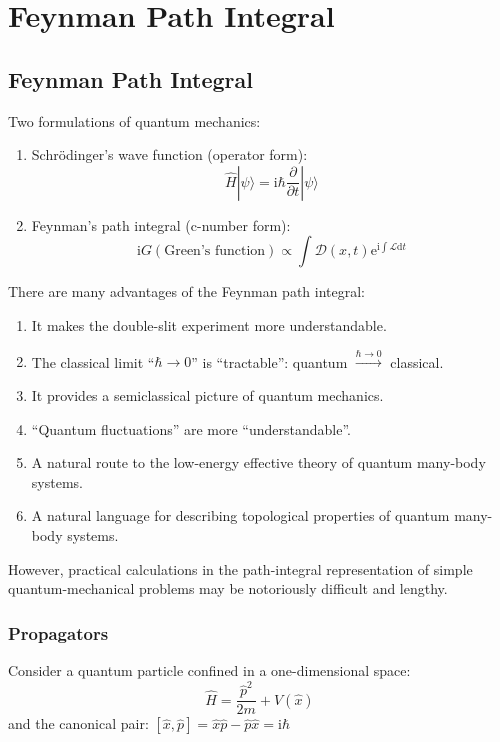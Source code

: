 \part{Feynman Path Integral}

\chapter{Feynman Path Integral}

Two formulations of quantum mechanics:
\begin{enumerate}
    \item Schrödinger's wave function (operator form):
    \begin{equation}
        \hat{H}|\psi\rangle = \mathrm{i}\hbar\frac{\partial}{\partial t}|\psi\rangle
    \end{equation}
    \item Feynman's path integral (c-number form):
    \begin{equation}
        \mathrm{i}G(\text{Green's function}) \propto \int \mathcal{D}(x, t) \mathrm{e}^{\mathrm{i}\int \mathcal{L} \mathrm{d}t}
    \end{equation}
\end{enumerate}

There are many advantages of the Feynman path integral:
\begin{enumerate}
    \item It makes the double-slit experiment more understandable.
    \item The classical limit \enquote{$\hbar \to 0$} is \enquote{tractable}:
    quantum $\xrightarrow{\hbar \to 0}$ classical.
    \item It provides a semiclassical picture of quantum mechanics.
    \item \enquote{Quantum fluctuations} are more \enquote{understandable}.
    \item A natural route to the low-energy effective theory of quantum many-body systems.
    \item A natural language for describing topological properties of quantum many-body systems.
\end{enumerate}

However, practical calculations in the path-integral representation
of simple quantum-mechanical problems may be notoriously
difficult and lengthy.

\section{Propagators}
Consider a quantum particle confined in a one-dimensional space:
\begin{equation}
\hat{H} = \frac{\hat{p}^2}{2m} + V(\hat{x})
\end{equation}
and the canonical pair: $[\hat{x}, \hat{p}] = \hat{x}\hat{p} - \hat{p}\hat{x} = \mathrm{i}\hbar$

